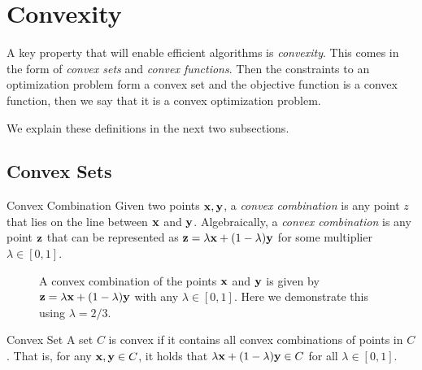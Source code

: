 \section{Convexity}
A key property that will enable efficient algorithms is \emph{convexity}.  This comes in the form of \emph{convex sets} and \emph{convex functions}.  Then the constraints to an optimization problem form a  convex set and the objective function is a convex function, then we say that it is a convex optimization problem.

We explain these definitions in the next two subsections.
\subsection{Convex Sets}

\begin{definition}{Convex Combination}{}
Given two points $\mathbf{x},\mathbf{y}$, a \emph{convex combination} is any point $z$ that lies on the line between $\mathbf{x}$ and $\mathbf{y}$.  Algebraically, a \emph{convex combination} is any point $\mathbf{z}$ that can be represented as $\mathbf{z} = \lambda \mathbf{x} + (	1-\lambda) \mathbf{y} $ for some multiplier $\lambda \in [0,1]$.
\end{definition}

\begin{figure}[h]
\begin{center}
\end{center}
\caption{A convex combination of the points $\mathbf{x}$ and $\mathbf{y}$ is given by $\mathbf{z} = \lambda \mathbf{x} + (1-\lambda)\mathbf{y}$ with any $\lambda \in [0,1]$.  Here we demonstrate this using $\lambda = 2/3$.  }
\end{figure}



\begin{definition}{Convex Set}{}
A set $C$ is convex if it contains all convex combinations of points in $C$.  That is, for any $\mathbf{x},\mathbf{y} \in C$, it holds that $ \lambda \mathbf{x} + (1-\lambda) \mathbf{y} \in C$ for all $\lambda \in [0,1]$.
\end{definition}


